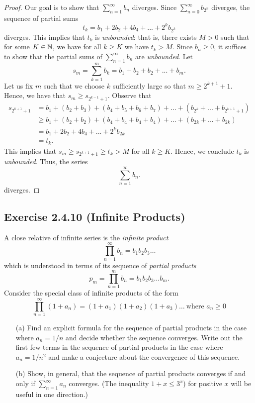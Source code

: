 \begin{proof}
    Our goal is to show that \( \sum_{n=1}^{ \infty} b_n\) diverges. Since \( \sum_{n=0}^{ \infty} b_{{2^n}} \) diverges, the sequence of partial sums 
    \[t_k = b_1 + 2b_2 + 4b_4 + ... + 2^k b_{2^k}\]
    diverges. This implies that \( t_k \) is \textit{unbounded}: that is, there exists \( M > 0 \) such that for some \( K \in \mathbb{N} \), we have for all \( k \geq K \) we have \( t_k > M \). Since \( b_n \geq 0\), it suffices to show that the partial sums of \( \sum_{n=1}^{ \infty} b_n\) are \textit{unbounded}. Let 
    \[ s_m = \sum_{k=1}^{m} b_k = b_1 + b_2 + b_2 + ... + b_m.  \]
    Let us fix \( m \) such that we choose \( k \) sufficiently large so that \( m \geq 2^{k+1} + 1 \). Hence, we have that \( s_m \geq s_{2^{k-1} + 1} \). Observe that 
    \begin{align*}
        s_{2^{k+1}+1} &= b_1 + (b_2 + b_3) + (b_4 + b_5 + b_6 + b_7) + ... + (b_{2^k} + ... + b_{2^{k+1}+1})  \\ 
                      &\geq b_1 + (b_2 + b_2) + (b_4 + b_4 + b_4 + b_4) + ... + (b_{2k} + ... + b_{2k}) \\
                      &= b_1 + 2b_2 + 4b_4 + ... + 2^k b_{2k} \\
                      &= t_k.
    \end{align*}
    This implies that \( s_m \geq s_{2^{k+1}+1} \geq t_k > M \) for all \( k \geq K\). Hence, we conclude \( t_k\) is \textit{unbounded}. Thus, the series 
    \[ \sum_{n=1}^{ \infty} b_n.\]
    diverges.
\end{proof}

















\subsection{Exercise 2.4.10 (Infinite Products)}
A close relative of infinite series is the \textit{infinite product} 
\[ \prod_{n=1}^{ \infty } b_n = b_1 b_2 b_3 \dots \]
which is understood in terms of its sequence of \textit{partial products}
\[ p_m = \prod_{n=1}^m b_n = b_1b_2b_3 \dots b_m.\]
Consider the special class of infinite products of the form 
\[ \prod_{n=1}^{ \infty} (1 + a_n) = (1+a_1)(1+a_2)(1+a_3) \dots ~ \text{where } a_n \geq 0 \]
\begin{enumerate}
    \item[(a)] Find an explicit formula for the sequence of partial products in the case where \( a_n = 1 / n \) and decide whether the sequence converges. Write out the first few terms in the sequence of partial products in the case where \( a_n = 1 / n^2\) and make a conjecture about the convergence of this sequence.
    \item[(b)] Show, in general, that the sequence of partial products converges if and only if \( \sum_{n=1}^{ \infty} a_n \) converges. (The inequality \( 1 + x \leq 3^x\)) for positive \( x \) will be useful in one direction.)
\end{enumerate}

